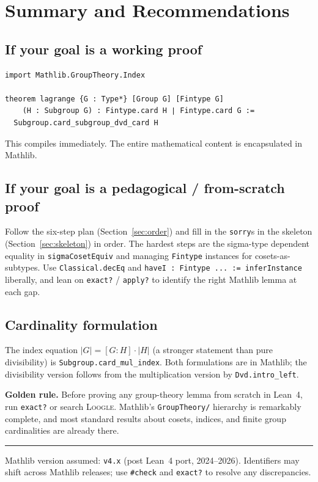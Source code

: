 \documentclass[11pt, a4paper]{article}
\theoremstyle{plain}
\theoremstyle{definition}
\newcommand{\abs}[1]{\lvert #1 \rvert}
\newcommand{\lean}[1]{\texttt{\color{lean-blue}#1}}
\begin{document}
\section{Summary and Recommendations}
\label{sec:summary}

\subsection{If your goal is a working proof}

\begin{lstlisting}
import Mathlib.GroupTheory.Index

theorem lagrange {G : Type*} [Group G] [Fintype G]
    (H : Subgroup G) : Fintype.card H ∣ Fintype.card G :=
  Subgroup.card_subgroup_dvd_card H
\end{lstlisting}

This compiles immediately. The entire mathematical content is encapsulated
in Mathlib.

\subsection{If your goal is a pedagogical / from-scratch proof}

Follow the six-step plan (Section~\ref{sec:order}) and fill in the
\lean{sorry}s in the skeleton (Section~\ref{sec:skeleton}) in order.
The hardest steps are the sigma-type dependent equality in
\lean{sigmaCosetEquiv} and managing \lean{Fintype} instances for
cosets-as-subtypes. Use \lean{Classical.decEq} and
\lean{haveI : Fintype ... := inferInstance} liberally, and lean on
\lean{exact?} / \lean{apply?} to identify the right Mathlib lemma at
each gap.

\subsection{Cardinality formulation}

The index equation $\abs{G} = [G:H] \cdot \abs{H}$ (a stronger statement
than pure divisibility) is \lean{Subgroup.card\_mul\_index}. Both
formulations are in Mathlib; the divisibility version follows from the
multiplication version by \lean{Dvd.intro\_left}.

\begin{notebox}
\textbf{Golden rule.} Before proving any group-theory lemma from scratch in
Lean~4, run \texttt{exact?} or search \textsc{Loogle}. Mathlib's
\texttt{GroupTheory/} hierarchy is remarkably complete, and most standard
results about cosets, indices, and finite group cardinalities are already
there.
\end{notebox}

\vspace{12pt}\hrule\vspace{6pt}
{\small\color{gray}
Mathlib version assumed: \texttt{v4.x} (post Lean~4 port, 2024--2026).
Identifiers may shift across Mathlib releases; use \texttt{\#check} and
\texttt{exact?} to resolve any discrepancies.}
\end{document}
